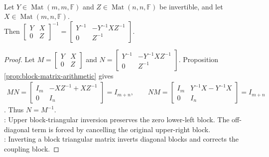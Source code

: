 \begin{proposition} \label{prop:block-upper-triangular-inverse} \\
Let $Y\in\operatorname{Mat}(m,m,\mathbb{F})$ and $Z\in\operatorname{Mat}(n,n,\mathbb{F})$ be invertible, and let $X\in\operatorname{Mat}(m,n,\mathbb{F})$.\\
Then $\begin{bmatrix}
Y & X\\
0 & Z
\end{bmatrix}^{-1}
=
\begin{bmatrix}
Y^{-1} & -Y^{-1}XZ^{-1}\\
0 & Z^{-1}
\end{bmatrix}$.
\begin{proof}
Let $M=\begin{bmatrix}Y&X\\0&Z\end{bmatrix}$ and $N=\begin{bmatrix}Y^{-1}&-Y^{-1}XZ^{-1}\\0&Z^{-1}\end{bmatrix}$. Proposition \ref{prop:block-matrix-arithmetic} gives
\begin{align}
MN=
\begin{bmatrix}
I_m&-XZ^{-1}+XZ^{-1}\\
0&I_n
\end{bmatrix}
=I_{m+n},
\qquad
NM=
\begin{bmatrix}
I_m&Y^{-1}X-Y^{-1}X\\
0&I_n
\end{bmatrix}
=I_{m+n} \nonumber
\end{align}. Thus $N=M^{-1}$.\\
: Upper block-triangular inversion preserves the zero lower-left block. The off-diagonal term is forced by cancelling the original upper-right block.\\
: Inverting a block triangular matrix inverts diagonal blocks and corrects the coupling block.
\end{proof}
\end{proposition}

